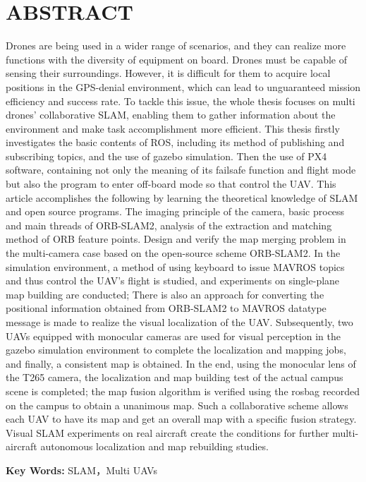 \chapter*{ABSTRACT}
\vspace{1em}
Drones are being used in a wider range of scenarios, and they can realize more functions with the diversity of equipment on board.
Drones must be capable of sensing their surroundings. 
However, it is difficult for them to acquire local positions in the GPS-denial environment, which can lead to unguaranteed mission efficiency and success rate. 
To tackle this issue, the whole thesis focuses on multi drones' collaborative SLAM, enabling them to gather information about the environment and make task accomplishment more efficient.
This thesis firstly investigates the basic contents of ROS, including its method of publishing and subscribing topics, and the use of gazebo simulation.
Then the use of PX4 software, containing not only the meaning of its failsafe function and flight mode but also the program to enter off-board mode so that control the UAV.
This article accomplishes the following by learning the theoretical knowledge of SLAM and open source programs.
The imaging principle of the camera, basic process and main threads of ORB-SLAM2, analysis of the extraction and matching method of ORB feature points.
Design and verify the map merging problem in the multi-camera case based on the open-source scheme ORB-SLAM2.
In the simulation environment, a method of using keyboard to issue MAVROS topics and thus control the UAV's flight is studied, and experiments on single-plane map building are conducted; There is also an approach for converting the positional information obtained from ORB-SLAM2 to MAVROS datatype message is made to realize the visual localization of the UAV.
Subsequently, two UAVs equipped with monocular cameras are used for visual perception in the gazebo simulation environment to complete the localization and mapping jobs, and finally, a consistent map is obtained.
In the end, using the monocular lens of the T265 camera, the localization and map building test of the actual campus scene is completed; the map fusion algorithm is verified using the rosbag recorded on the campus to obtain a unanimous map.
Such a collaborative scheme allows each UAV to have its map and get an overall map with a specific fusion strategy. Visual SLAM experiments on real aircraft create the conditions for further multi-aircraft autonomous localization and map rebuilding studies.

\vspace{0.1in}
\noindent \textbf{Key Words:} SLAM，Multi UAVs
